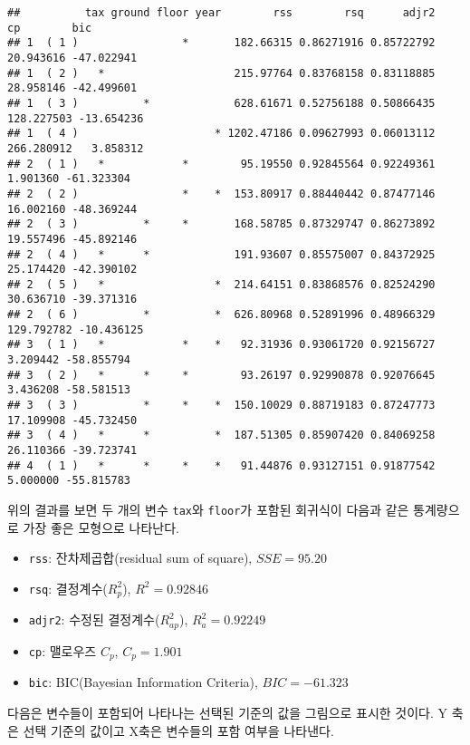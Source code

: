 \documentclass[
]{book}
\providecommand{\tightlist}{%
  \setlength{\itemsep}{0pt}\setlength{\parskip}{0pt}}
\begin{document}
\begin{verbatim}
##          tax ground floor year        rss        rsq      adjr2         cp        bic
## 1  ( 1 )                *       182.66315 0.86271916 0.85722792  20.943616 -47.022941
## 1  ( 2 )   *                    215.97764 0.83768158 0.83118885  28.958146 -42.499601
## 1  ( 3 )          *             628.61671 0.52756188 0.50866435 128.227503 -13.654236
## 1  ( 4 )                     * 1202.47186 0.09627993 0.06013112 266.280912   3.858312
## 2  ( 1 )   *            *        95.19550 0.92845564 0.92249361   1.901360 -61.323304
## 2  ( 2 )                *    *  153.80917 0.88440442 0.87477146  16.002160 -48.369244
## 2  ( 3 )          *     *       168.58785 0.87329747 0.86273892  19.557496 -45.892146
## 2  ( 4 )   *      *             191.93607 0.85575007 0.84372925  25.174420 -42.390102
## 2  ( 5 )   *                 *  214.64151 0.83868576 0.82524290  30.636710 -39.371316
## 2  ( 6 )          *          *  626.80968 0.52891996 0.48966329 129.792782 -10.436125
## 3  ( 1 )   *            *    *   92.31936 0.93061720 0.92156727   3.209442 -58.855794
## 3  ( 2 )   *      *     *        93.26197 0.92990878 0.92076645   3.436208 -58.581513
## 3  ( 3 )          *     *    *  150.10029 0.88719183 0.87247773  17.109908 -45.732450
## 3  ( 4 )   *      *          *  187.51305 0.85907420 0.84069258  26.110366 -39.723741
## 4  ( 1 )   *      *     *    *   91.44876 0.93127151 0.91877542   5.000000 -55.815783
\end{verbatim}

위의 결과를 보면 두 개의 변수 \texttt{tax}와 \texttt{floor}가 포함된 회귀식이 다음과 같은 통계량으로 가장 좋은 모형으로 나타난다.

\begin{itemize}
\tightlist
\item
  \texttt{rss}: 잔차제곱합(residual sum of square), \(SSE = 95.20\)
\item
  \texttt{rsq}: 결정계수(\(R^2_p\)), \(R^2=0.92846\)
\item
  \texttt{adjr2}: 수정된 결정계수(\(R^2_{ap}\)), \(R^2_a=0.92249\)
\item
  \texttt{cp}: 맬로우즈 \(C_p\), \(C_p = 1.901\)
\item
  \texttt{bic}: BIC(Bayesian Information Criteria), \(BIC= -61.323\)
\end{itemize}

다음은 변수들이 포함되어 나타나는 선택된 기준의 값을 그림으로 표시한 것이다.
Y 축은 선택 기준의 값이고 X축은 변수들의 포함 여부을 나타낸다.
\end{document}
